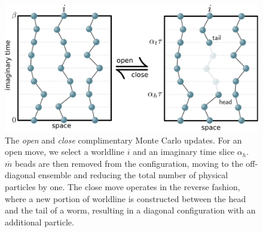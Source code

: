 \documentclass[prb,aps,amssym,nofootinbib,floatfix,notitlepage]{revtex4-1}
\begin{document}
\begin{figure}
\begin{center}
\includegraphics[width=0.70\columnwidth]{Figures/openclose.pdf}
\end{center}
\caption{The \emph{open} and \emph{close} complimentary Monte Carlo updates.
For an open move, we select a worldline $i$ and an imaginary time slice
$\alpha_h$.  $\overline{m}$ beads are then removed from the configuration,
moving to the off-diagonal ensemble and reducing the total number of physical
particles by one.  The close move operates in the reverse fashion, where a new
portion of worldline is constructed between the head and the tail of a worm,
resulting in a diagonal configuration with an additional particle.}
\label{fig:openclose}
 \end{figure}
%
\end{document}
